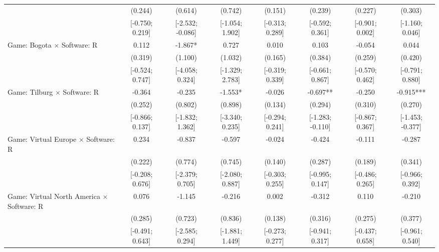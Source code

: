 \begin{tabular}{l*{7}{c}}
                    &     (0.244)   &     (0.614)   &     (0.742)   &     (0.151)   &     (0.239)   &     (0.227)   &     (0.303)   \\
                    &[-0.750; 0.219]   &[-2.532; -0.086]   &[-1.054; 1.902]   &[-0.313; 0.289]   &[-0.592; 0.361]   &[-0.901; 0.002]   &[-1.160; 0.046]   \\
Game: Bogota $\times$ Software: R&       0.112   &      -1.867*  &       0.727   &       0.010   &       0.103   &      -0.054   &       0.044   \\
                    &     (0.319)   &     (1.100)   &     (1.032)   &     (0.165)   &     (0.384)   &     (0.259)   &     (0.420)   \\
                    &[-0.524; 0.747]   &[-4.058; 0.324]   &[-1.329; 2.783]   &[-0.319; 0.339]   &[-0.661; 0.867]   &[-0.570; 0.462]   &[-0.791; 0.880]   \\
Game: Tilburg $\times$ Software: R&      -0.364   &      -0.235   &      -1.553*  &      -0.026   &      -0.697** &      -0.250   &      -0.915***\\
                    &     (0.252)   &     (0.802)   &     (0.898)   &     (0.134)   &     (0.294)   &     (0.310)   &     (0.270)   \\
                    &[-0.866; 0.137]   &[-1.832; 1.362]   &[-3.340; 0.235]   &[-0.294; 0.241]   &[-1.283; -0.110]   &[-0.867; 0.367]   &[-1.453; -0.377]   \\
Game: Virtual Europe $\times$ Software: R&       0.234   &      -0.837   &      -0.597   &      -0.024   &      -0.424   &      -0.111   &      -0.287   \\
                    &     (0.222)   &     (0.774)   &     (0.745)   &     (0.140)   &     (0.287)   &     (0.189)   &     (0.341)   \\
                    &[-0.208; 0.676]   &[-2.379; 0.705]   &[-2.080; 0.887]   &[-0.303; 0.255]   &[-0.995; 0.147]   &[-0.486; 0.265]   &[-0.966; 0.392]   \\
Game: Virtual North America $\times$ Software: R&       0.076   &      -1.145   &      -0.216   &       0.002   &      -0.312   &       0.110   &      -0.210   \\
                    &     (0.285)   &     (0.723)   &     (0.836)   &     (0.138)   &     (0.316)   &     (0.275)   &     (0.377)   \\
                    &[-0.491; 0.643]   &[-2.585; 0.294]   &[-1.881; 1.449]   &[-0.273; 0.277]   &[-0.941; 0.317]   &[-0.437; 0.658]   &[-0.961; 0.540]   \\

\end{tabular}

